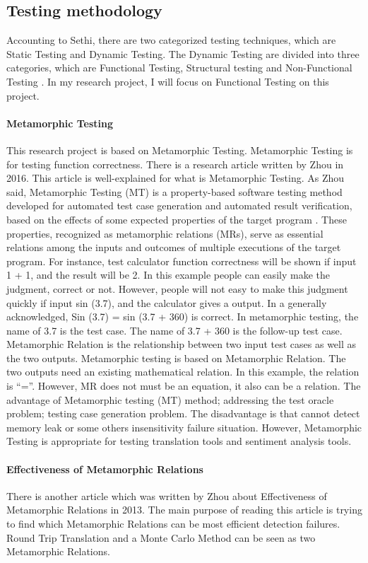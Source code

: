 \documentclass[conference]{IEEEtran}
\begin{document}
\subsection{Testing methodology}
Accounting to Sethi, there are two categorized testing
techniques, which are Static Testing and Dynamic Testing. The Dynamic Testing
are divided into three categories, which are Functional Testing, Structural
testing and Non-Functional Testing \cite{testingMethodReview}.
In my research project, I will focus on Functional Testing on this project.

\paragraph{Metamorphic Testing}
This research project is based on Metamorphic Testing.
Metamorphic Testing is for testing function correctness.
There is a research article written by Zhou in 2016. This article is
well-explained for what is Metamorphic Testing.
As Zhou said, Metamorphic Testing (MT) is a property-based software testing
method developed for automated test case generation and automated result
verification, based on the effects of some expected properties of the target
program \cite{zhou2016metamorphic}.
These properties, recognized as metamorphic relations (MRs), serve as essential
relations among the inputs and outcomes of multiple executions of the target
program.
For instance, test calculator function correctness will be shown if input 1 + 1,
and the result will be 2. In this example people can easily make the judgment,
correct or not.
However, people will not easy to make this judgment quickly if input sin (3.7),
and the calculator gives a output.
In a generally acknowledged, Sin (3.7) = sin (3.7 + 360) is correct.
In metamorphic testing, the name of 3.7 is the test case. The name of 3.7 + 360
is the follow-up test case.
Metamorphic Relation is the relationship between two input test cases as well as
the two outputs.
Metamorphic testing is based on Metamorphic Relation.
The two outputs need an existing mathematical relation.
In this example, the relation is “=”. However, MR does not must be an equation,
it also can be a relation.
The advantage of Metamorphic testing (MT) method; addressing the test oracle
problem; testing case generation problem.
The disadvantage is that cannot detect memory leak or some others insensitivity
failure situation.
However, Metamorphic Testing is appropriate for testing translation tools and
sentiment analysis tools.
\paragraph{Effectiveness of Metamorphic Relations}
\cite{cao2013correlation}
There is another article which was written by Zhou about Effectiveness of
Metamorphic Relations in 2013.
The main purpose of reading this article is trying to find which Metamorphic
Relations can be most efficient detection failures.
Round Trip Translation and a Monte Carlo Method can be seen as two Metamorphic Relations.
\end{document}
